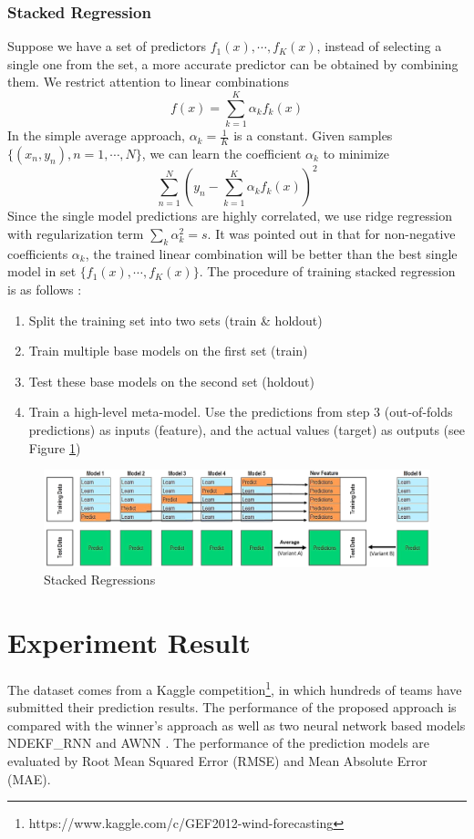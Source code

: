 \documentclass[conference]{IEEEtran}
\begin{document}
\subsubsection{Stacked Regression}
Suppose we have a set of predictors  $f_1(x), \cdots, f_K(x)$, instead of selecting a single one from the set, a more accurate predictor can be obtained by combining them. We restrict attention to linear combinations
\begin{equation}
    f(x) = \sum_{k=1}^K \alpha_k f_k(x)
\end{equation}
In the simple average approach, $\alpha_k = \frac{1}{K}$ is a constant. Given samples $\{(x_n,y_n),n=1,\cdots,N\}$, we can learn the coefficient $\alpha_k$ to minimize 
$$ \sum_{n=1}^N (y_n - \sum_{k=1}^K \alpha_k f_k(x))^2
$$
Since the single model predictions are highly correlated, we use ridge regression with regularization term $\sum_k \alpha_k^2 = s$. It was pointed out in \cite{Breiman1996} that for non-negative coefficients $\alpha_k$, the trained linear combination will be better than the best single model in set $\{f_1(x), \cdots, f_K(x)\}$. The procedure of training stacked regression is as follows :
\begin{enumerate}
    \item Split the training set into two sets (train \& holdout)
    \item Train multiple base models on the first set (train)
    \item Test these base models on the second set (holdout)
    \item Train a high-level meta-model. Use the predictions from step 3 (out-of-folds predictions) as inputs (feature), and the actual values (target) as outputs (see Figure \ref{fig:stack})
\end{enumerate}

\begin{figure}[h]
\centering
\includegraphics[width=0.9\columnwidth]{FIG/stack}
\caption{Stacked Regressions}
\label{fig:stack}
\end{figure}



\section{Experiment Result}
The dataset comes from a Kaggle competition\footnote{https://www.kaggle.com/c/GEF2012-wind-forecasting}, in which hundreds of teams have submitted their prediction results. The performance of the proposed approach is compared with the winner's approach \cite{SILVA2014395} as well as two neural network based models NDEKF\_RNN \cite{Kanna13} and AWNN \cite{7894735}. The performance of the prediction models are evaluated by Root Mean Squared Error (RMSE) and Mean Absolute Error (MAE). 
\end{document}
